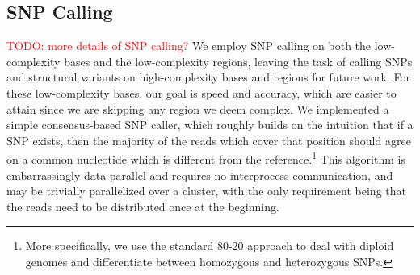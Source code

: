 \documentclass[10pt]{article}
\newcommand\TODO[1]{\textcolor{red}{TODO: #1}}
\begin{document}
\subsection{SNP Calling}

\TODO{more details of SNP calling?}
We employ SNP calling on both the low-complexity bases and the low-complexity regions, leaving the task of calling SNPs and structural variants on high-complexity bases and regions for future work.
For these low-complexity bases, our goal is speed and accuracy, which are easier to attain since we are skipping any region we deem complex.
We implemented a simple consensus-based SNP caller, which roughly builds on the intuition that if a SNP exists, then the majority of the reads which cover that position should agree on a common nucleotide which is different from the reference.\footnote{More specifically, we use the standard 80-20 approach \cite{gatk} to deal with diploid genomes and differentiate between homozygous and heterozygous SNPs.}
This algorithm is embarrassingly data-parallel and requires no interprocess communication, and may be trivially parallelized over a cluster, with the only requirement being that the reads need to be distributed once at the beginning.

%
\end{document}
